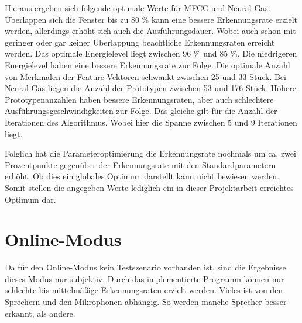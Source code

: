 Hieraus ergeben sich folgende optimale Werte für MFCC und Neural Gas. Überlappen sich die Fenster bis zu 80 \% kann eine bessere Erkennungsrate erzielt werden, allerdings erhöht sich auch die Ausführungsdauer. Wobei auch schon mit geringer oder gar keiner Überlappung beachtliche Erkennungsraten erreicht werden. Das optimale Energielevel liegt zwischen 96 \% und 85 \%. Die niedrigeren Energielevel haben eine bessere Erkennungsrate zur Folge. Die optimale Anzahl von Merkmalen der Feature Vektoren schwankt zwischen 25 und 33 Stück. Bei Neural Gas liegen die Anzahl der Prototypen zwischen 53 und 176 Stück. Höhere Prototypenanzahlen haben bessere Erkennungsraten, aber auch schlechtere Ausführungsgeschwindigkeiten zur Folge. Das gleiche gilt für die Anzahl der Iterationen des Algorithmus. Wobei hier die Spanne zwischen 5 und 9 Iterationen liegt.

Folglich hat die Parameteroptimierung die Erkennungsrate nochmals um ca. zwei Prozentpunkte gegenüber der Erkennungsrate mit den Standardparametern erhöht. Ob dies ein globales Optimum darstellt kann nicht bewiesen werden. Somit stellen die angegeben Werte lediglich ein in dieser Projektarbeit erreichtes Optimum dar.

\section{Online-Modus}
Da für den Online-Modus kein Testszenario vorhanden ist, sind die Ergebnisse dieses Modus nur subjektiv. Durch das implementierte Programm können nur schlechte bis mittelmäßige Erkennungsraten erzielt werden. Vieles ist von den Sprechern und den Mikrophonen abhängig. So werden manche Sprecher besser erkannt, als andere.
